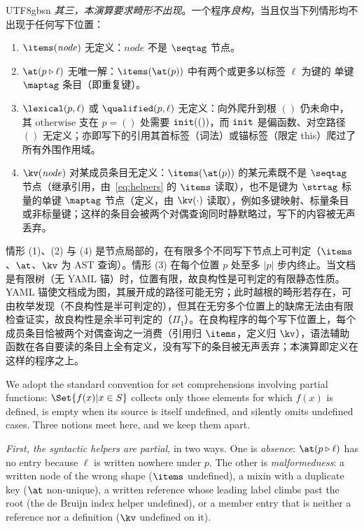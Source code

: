 \begin{CJK*}{UTF8}{gbsn}
\emph{其三，本演算要求畸形不出现}。一个程序\emph{良构}，当且仅当下列情形均不出现于任何写下位置：
\begin{enumerate}
  \item $\items(\mathit{node})$ 无定义：$\mathit{node}$ 不是 $\seqtag$ 节点。
  \item $\at(p \snoc \ell)$ 无唯一解：$\items(\at(p))$ 中有两个或更多以标签 $\ell$ 为键的
        单键 $\maptag$ 条目（即重复键）。
  \item $\lexical(p, \ell)$ 或 $\qualified(p, \ell)$ 无定义：向外爬升到根 $()$ 仍未命中，其 $\text{otherwise}$ 支在 $p = ()$ 处需要 $\mathtt{init}(())$，而 $\mathtt{init}$ 是偏函数、对空路径 $()$ 无定义；亦即写下的引用其首标签（词法）或锚标签（限定 this）爬过了所有外围作用域。
  \item $\kv(\mathit{node})$ 对某成员条目无定义：$\items(\at(p))$ 的某元素既不是 $\seqtag$ 节点（继承引用，由~\eqref{eq:helpers} 的 $\items$ 读取），也不是键为 $\strtag$ 标量的单键 $\maptag$ 节点（定义，由 $\kv(\cdot)$ 读取），例如多键映射、标量条目或非标量键；这样的条目会被两个对偶查询同时静默略过，写下的内容被无声丢弃。
\end{enumerate}
情形 (1)、(2) 与 (4) 是节点局部的，在有限多个不同写下节点上可判定（$\items$、$\at$、$\kv$ 为 AST 查询）。情形 (3) 在每个位置 $p$ 处至多 $|p|$ 步内终止。当文档是有限树（无 YAML 锚）时，位置有限，故良构性是可判定的有限静态性质。YAML 锚使文档成为图，其展开成的路径可能无穷；此时越根的畸形若存在，可由枚举发现（不良构性是半可判定的），但其在无穷多个位置上的缺席无法由有限检查证实，故良构性是余半可判定的（$\Pi_1$）。在良构程序的每个写下位置上，每个成员条目恰被两个对偶查询之一消费（引用归 $\items$，定义归 $\kv$），语法辅助函数在各自要读的条目上全有定义，没有写下的条目被无声丢弃；本演算即定义在这样的程序之上。

\else
\begin{sloppypar}
We adopt the standard convention for set comprehensions involving partial functions:
$\Set{ f(x) | x \in S }$ collects only those elements for which $f(x)$ is defined,
is empty when its source is itself undefined, and silently omits undefined cases.
Three notions meet here, and we keep them apart.
\end{sloppypar}

\emph{First, the syntactic helpers are partial,} in two ways. One is \emph{absence}:
$\at(p \snoc \ell)$ has no entry because $\ell$ is written nowhere under $p$. The other is
\emph{malformedness}: a written node of the wrong shape ($\items$ undefined), a mixin with a
duplicate key ($\at$ non-unique), a written reference whose leading label climbs past the
root (the de Bruijn index helper undefined), or a member entry that is neither a reference
nor a definition ($\kv$ undefined on it).


\end{CJK*}
